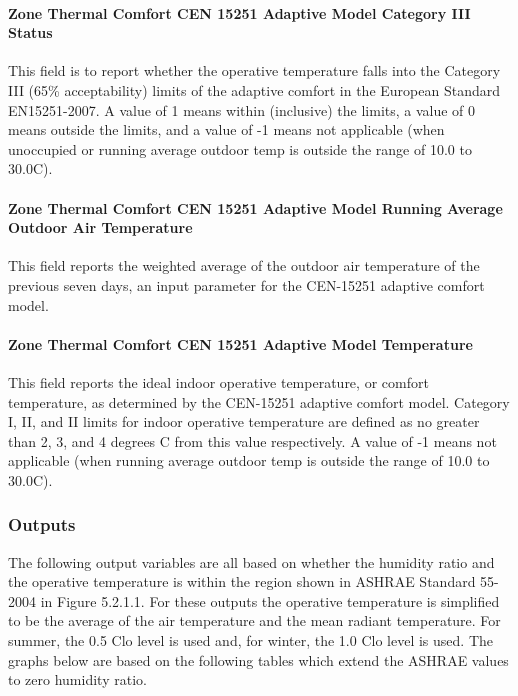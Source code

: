 \paragraph{Zone Thermal Comfort CEN 15251 Adaptive Model Category III Status}\label{zone-thermal-comfort-cen-15251-adaptive-model-category-iii-status}

This field is to report whether the operative temperature falls into the Category III (65\% acceptability) limits of the adaptive comfort in the European Standard EN15251-2007. A value of 1 means within (inclusive) the limits, a value of 0 means outside the limits, and a value of -1 means not applicable (when unoccupied or running average outdoor temp is outside the range of 10.0 to 30.0C).

\paragraph{Zone Thermal Comfort CEN 15251 Adaptive Model Running Average Outdoor Air Temperature}\label{zone-thermal-comfort-cen-15251-adaptive-model-running-average-outdoor-air-temperature}

This field reports the weighted average of the outdoor air temperature of the previous seven days, an input parameter for the CEN-15251 adaptive comfort model.

\paragraph{Zone Thermal Comfort CEN 15251 Adaptive Model Temperature}\label{zone-thermal-comfort-cen-15251-adaptive-model-temperature}

This field reports the ideal indoor operative temperature, or comfort temperature, as determined by the CEN-15251 adaptive comfort model. Category I, II, and II limits for indoor operative temperature are defined as no greater than 2, 3, and 4 degrees C from this value respectively. A value of -1 means not applicable (when running average outdoor temp is outside the range of 10.0 to 30.0C).

\subsubsection{Outputs}\label{outputs-1-014}

The following output variables are all based on whether the humidity ratio and the operative temperature is within the region shown in ASHRAE Standard 55-2004 in Figure 5.2.1.1. For these outputs the operative temperature is simplified to be the average of the air temperature and the mean radiant temperature. For summer, the 0.5 Clo level is used and, for winter, the 1.0 Clo level is used. The graphs below are based on the following tables which extend the ASHRAE values to zero humidity ratio.

